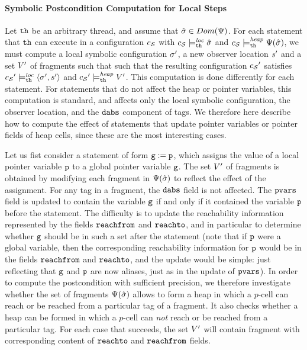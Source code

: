 \paragraph{Symbolic Postcondition Computation for Local Steps}
Let ${\tt th}$ be an arbitrary thread, and assume
that $\hat{\sigma} \in Dom(\Psi)$.
For each statement that ${\tt th}$ can execute in a configuration $c_{\mathcal S}$
with $c_{\mathcal S} \models_{{\tt th}}^{\mathit{loc}} \hat{\sigma}$ and
$c_{\mathcal S} \models_{{\tt th}}^{\mathit{heap}} \Psi(\hat{\sigma})$,
we must compute a local symbolic configuration $\sigma'$, a new
observer location $s'$ and a set  $V'$ of fragments such that
such that the resulting configuration ${c_{\mathcal S}}'$ satisfies
  ${c_{\mathcal S}}' \models_{{\tt th}}^{\mathit{loc}} \left\langle\sigma',s'\right\rangle$ and
  ${c_{\mathcal S}}' \models_{{\tt th}}^{\mathit{heap}} V'$.
This computation is done differently for
each statement. For statements that do not affect the heap or pointer variables,
this computation is standard, and affects only the local symbolic
configuration, the observer location, and the $\mathtt{dabs}$ component of
tags.
We therefore here describe how to compute the effect of statements that update
pointer variables or pointer fields of heap cells,
since these are the most interesting cases.

Let us fist consider a statement of form $\mathtt{g} := \mathtt{p}$,
which assigns the value of a local pointer variable $\mathtt{p}$ to a global
pointer variable $\mathtt{g}$. The set $V'$ of fragments is obtained by
modifying each fragment in $\Psi(\hat{\sigma})$ to reflect the effect
of the assignment. For any tag in a fragment, the $\mathtt{dabs}$ field is not affected.
The $\mathtt{pvars}$ field  is updated to contain the variable $\mathtt{g}$ if and only if it contained the variable $\mathtt{p}$ before the statement. 
The difficulty is to update the reachability information represented
by the fields $\mathtt{reachfrom}$ and $\mathtt{reachto}$,
and in particular to determine whether $\mathtt{g}$ should be in such a
set after the statement
(note that if $\mathtt{p}$ were a global variable, then the corresponding
reachability information for $\mathtt{p}$ would be in the fields
$\mathtt{reachfrom}$ and $\mathtt{reachto}$, and the update would be simple: just
reflecting that $\mathtt{g}$ and $\mathtt{p}$ are now aliases, just as
in the update of $\mathtt{pvars}$).
In order to compute the postcondition with sufficient precision, we
therefore investigate whether the set of fragments $\Psi(\hat{\sigma})$
allows to form a heap in which a $p$-cell can reach or be
reached from a particular tag of a fragment.
It also checks whether a heap can be formed
in which a $p$-cell can {\em not} reach or be reached from a particular tag.
For each
case that succeeds, the set $V'$ will contain fragment with
corresponding content of $\mathtt{reachto}$ and $\mathtt{reachfrom}$ fields.

